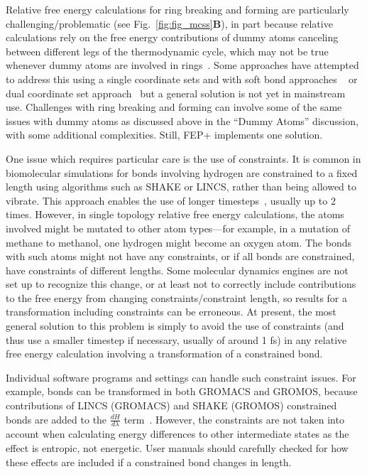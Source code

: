 \documentclass[9pt,bestpractices]{livecoms}
\begin{document}
 \label{subsec: Ring breaking and forming}
Relative free energy calculations for ring breaking and forming are particularly challenging/problematic (see Fig.~\ref{fig:fig_mcss}\textbf{B}), in part because relative calculations rely on the free energy contributions of dummy atoms canceling between different legs of the thermodynamic cycle, which may not be true whenever dummy atoms are involved in rings~\cite{liu2015ring}.
Some approaches have attempted to address this using a single coordinate sets and with soft bond approaches ~\cite{clark2019relative,wang2017accurate} or dual coordinate set approach~\cite{jespers2019qligfep, ries2022relative, bhati2017, bieniek2021} but a general solution is not yet in mainstream use. Challenges with ring breaking and forming can involve some of the same issues with dummy atoms as discussed above in the ``Dummy Atoms'' discussion, with some additional complexities. Still, FEP+ implements one solution\cite{wang2017accurate}.

One issue which requires particular care is the use of constraints.
It is common in biomolecular simulations for bonds involving hydrogen are constrained to a fixed length using algorithms such as SHAKE or LINCS, rather than being allowed to vibrate.  This approach enables the use of longer timesteps~\cite{krautler2001fast}, usually up to 2 times. 
However, in single topology relative free energy calculations, the atoms involved might be mutated to other atom types---for example, in a mutation of methane to methanol, one hydrogen might become an oxygen atom. The bonds with such atoms might not have any constraints, or if all bonds are constrained, have constraints of different lengths. 
Some molecular dynamics engines are not set up to recognize this change, or at least not to correctly include contributions to the free energy from changing constraints/constraint length, so results for a transformation including constraints can be erroneous.
At present, the most general solution to this problem is simply to avoid the use of constraints (and thus use a smaller timestep if necessary, usually of around 1 fs) in any relative free energy calculation involving a transformation of a constrained bond. 

Individual software programs and settings can handle such constraint issues. For example, bonds can be transformed in both GROMACS and GROMOS, because contributions of LINCS (GROMACS) and SHAKE (GROMOS) constrained bonds are added to the $\frac{dH}{d\lambda}$ term~\cite{pearlman1993determining, straatsma1992holonomic, pearlman1991overlooked, gunsteren1989computer}. However, the constraints are not taken into account when calculating energy differences to other intermediate states as the effect is entropic, not energetic. User manuals should carefully checked for how these effects are included if a constrained bond changes in length. 
\end{document}
